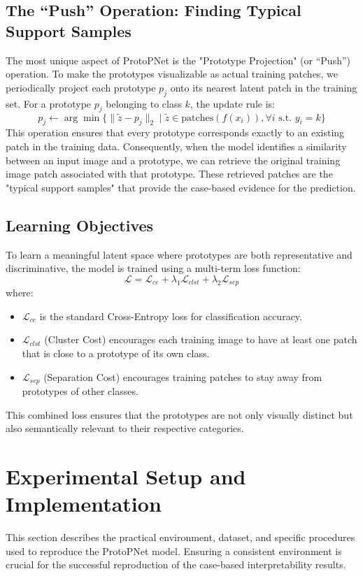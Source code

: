 \documentclass[conference]{IEEEtran}
\begin{document}
\subsection{The ``Push'' Operation: Finding Typical Support Samples}
The most unique aspect of ProtoPNet is the "Prototype Projection" (or ``Push'') operation. To make the prototypes visualizable as actual training patches, we periodically project each prototype $p_j$ onto its nearest latent patch in the training set. For a prototype $p_j$ belonging to class $k$, the update rule is:
\begin{equation}
    p_j \leftarrow \arg \min \{ \|\tilde{z} - p_j\|_2 \mid \tilde{z} \in \text{patches}(f(x_i)), \forall i \text{ s.t. } y_i = k \}
\end{equation}
This operation ensures that every prototype corresponds exactly to an existing patch in the training data. Consequently, when the model identifies a similarity between an input image and a prototype, we can retrieve the original training image patch associated with that prototype. These retrieved patches are the "typical support samples" that provide the case-based evidence for the prediction.

\subsection{Learning Objectives}
To learn a meaningful latent space where prototypes are both representative and discriminative, the model is trained using a multi-term loss function:
\begin{equation}
    \mathcal{L} = \mathcal{L}_{ce} + \lambda_1 \mathcal{L}_{clst} + \lambda_2 \mathcal{L}_{sep}
\end{equation}
where:
\begin{itemize}
    \item $\mathcal{L}_{ce}$ is the standard Cross-Entropy loss for classification accuracy.
    \item $\mathcal{L}_{clst}$ (Cluster Cost) encourages each training image to have at least one patch that is close to a prototype of its own class.
    \item $\mathcal{L}_{sep}$ (Separation Cost) encourages training patches to stay away from prototypes of other classes.
\end{itemize}
This combined loss ensures that the prototypes are not only visually distinct but also semantically relevant to their respective categories.

\section{Experimental Setup and Implementation}
\label{sec:experiments}
This section describes the practical environment, dataset, and specific procedures used to reproduce the ProtoPNet model. Ensuring a consistent environment is crucial for the successful reproduction of the case-based interpretability results.
\end{document}
